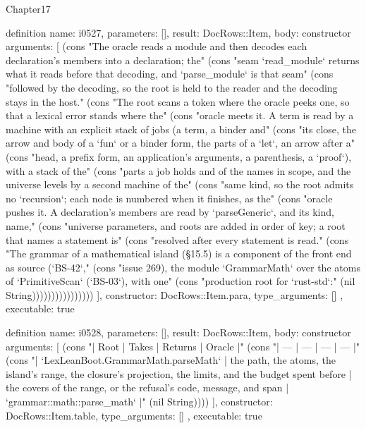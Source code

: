 \begin{lexlean}{Chapter17}
\begin{semanticmodule}
definition{
  name: i0527,
  parameters: [],
  result: DocRows::Item,
  body: constructor{
    arguments: [
      (cons "The oracle reads a module and then decodes each declaration's members into a declaration; the" (cons "seam `read_module` returns what it reads before that decoding, and `parse_module` is that seam" (cons "followed by the decoding, so the root is held to the reader and the decoding stays in the host." (cons "The root scans a token where the oracle peeks one, so that a lexical error stands where the" (cons "oracle meets it. A term is read by a machine with an explicit stack of jobs (a term, a binder and" (cons "its close, the arrow and body of a `fun` or a binder form, the parts of a `let`, an arrow after a" (cons "head, a prefix form, an application's arguments, a parenthesis, a `proof`), with a stack of the" (cons "parts a job holds and of the names in scope, and the universe levels by a second machine of the" (cons "same kind, so the root admits no `recursion`; each node is numbered when it finishes, as the" (cons "oracle pushes it. A declaration's members are read by `parseGeneric`, and its kind, name," (cons "universe parameters, and roots are added in order of key; a root that names a statement is" (cons "resolved after every statement is read." (cons "The grammar of a mathematical island (§15.5) is a component of the front end as source (`BS-42`," (cons "issue 269), the module `GrammarMath` over the atoms of `PrimitiveScan` (`BS-03`), with one" (cons "production root for `rust-std`:" (nil String))))))))))))))))
    ],
    constructor: DocRows::Item.para,
    type_arguments: []
  },
  executable: true
}

definition{
  name: i0528,
  parameters: [],
  result: DocRows::Item,
  body: constructor{
    arguments: [
      (cons "| Root | Takes | Returns | Oracle |" (cons "| --- | --- | --- | --- |" (cons "| `LexLeanBoot.GrammarMath.parseMath` | the path, the atoms, the island's range, the closure's projection, the limits, and the budget spent before | the covers of the range, or the refusal's code, message, and span | `grammar::math::parse_math` |" (nil String))))
    ],
    constructor: DocRows::Item.table,
    type_arguments: []
  },
  executable: true
}


\end{semanticmodule}
\end{lexlean}
